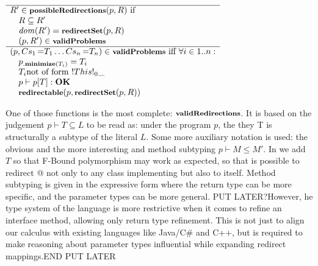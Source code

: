 \noindent$\begin{array}{l}
\hline
R' \in \fop{possibleRedirections}{p, R} \text{ if }\\\quad
R \subseteq R'\\\quad
\dom{R'} = \fop{redirectSet}{p, R}\\\quad
(p, R') \in \opName{validProblems}\\
\hline
(p, Cs_1\eq{T_1}\ldots Cs_n\eq{T_n}) \in \opName{validProblems} \text{ iff }
\forall i \in 1..n:\\\quad
    p\op{minimize}{T_i}=T_i\\\quad
    T_i \text{not of form } \This0{\_}\\\quad
    p \vdash p[T] : \textbf{OK}\\\quad %
    \fop{redirectable}{p, \fop{redirectSet}{p, R}}
\end{array}$

One of those functions is the most  complete:
$\opName{validRedirections}$. It is based on the judgement
$p \vdash T \subseteq L$
to be read as: under the program $p$,
the they T is structurally a subtype of the literal $L$.
Some more auxiliary notation is used: the obvious 
and the more interesting 
 and method subtyping
$p\vdash M \leq M'$.
In  we add $T$ so that F-Bound polymorphism may work as expected, so that is possible to redirect @
not only to any class implementing \Q@Foo@ but also to
\Q@Foo@ itself.
Method subtyping is given in the expressive form where the return type can be more specific, and the parameter types can be more general.
PUT LATER?However, he type system of the language is more restrictive when 
it comes to refine an interface method, allowing only return type refinement. This is not just to align our calculus with existing languages like Java/C\# and C++, but is required to make reasoning about parameter types influential while expanding redirect mappings.END PUT LATER

